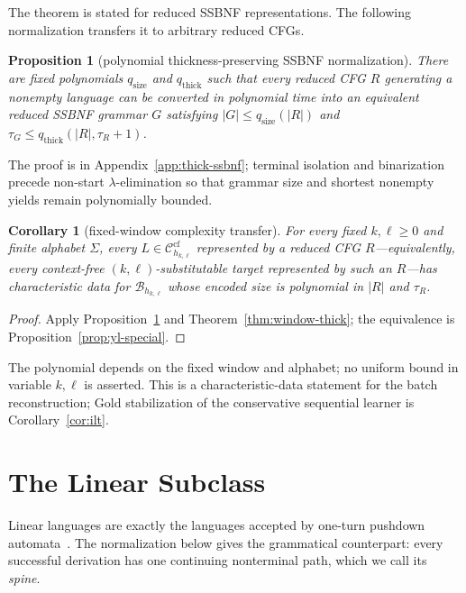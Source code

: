 \documentclass[11pt,a4paper]{article}
\newtheorem{proposition}[theorem]{Proposition}
\newtheorem{corollary}[theorem]{Corollary}
\theoremstyle{remark}
\theoremstyle{plain}
\newcommand{\cf}{\mathrm{cf}}
\newcommand{\Ccf}[1]{\mathcal C_{#1}^{\cf}}
\begin{document}
The theorem is stated for reduced SSBNF representations.  The following
normalization transfers it to arbitrary reduced CFGs.

\begin{proposition}[polynomial thickness-preserving SSBNF normalization]
\label{prop:thick-ssbnf-normal}
There are fixed polynomials $q_{\mathrm{size}}$ and $q_{\mathrm{thick}}$ such that every reduced CFG
$R$ generating a nonempty language can be converted in polynomial time into
an equivalent reduced SSBNF grammar $G$ satisfying
$|G|\le q_{\mathrm{size}}(|R|)$ and
$\tau_G\le q_{\mathrm{thick}}(|R|,\tau_R+1)$.
\end{proposition}

The proof is in Appendix~\ref{app:thick-ssbnf}; terminal isolation and
binarization precede non-start $\lambda$-elimination so that grammar size and
shortest nonempty yields remain polynomially bounded.

\begin{corollary}[fixed-window complexity transfer]
\label{cor:window-transfer}
For every fixed $k,\ell\ge0$ and finite alphabet $\Sigma$, every
$L\in\Ccf{h_{k,\ell}}$ represented by a reduced CFG $R$---equivalently,
every context-free $(k,\ell)$-substitutable target represented by such an
$R$---has characteristic data for $\mathcal B_{h_{k,\ell}}$ whose encoded
size is polynomial in $|R|$ and $\tau_R$.
\end{corollary}

\begin{proof}
Apply Proposition~\ref{prop:thick-ssbnf-normal} and
Theorem~\ref{thm:window-thick}; the equivalence is
Proposition~\ref{prop:yl-special}.
\end{proof}

The polynomial depends on the fixed window and alphabet; no uniform bound in
variable $k,\ell$ is asserted.  This is a characteristic-data statement for
the batch reconstruction; Gold stabilization of the conservative sequential
learner is Corollary~\ref{cor:ilt}.

\section{The Linear Subclass}
\label{sec:linear}

Linear languages are exactly the languages accepted by one-turn pushdown
automata~\cite{ginsburg-spanier1966,autebert1997}.  The normalization below
gives the grammatical counterpart: every successful derivation has one
continuing nonterminal path, which we call its \emph{spine}.
\end{document}
